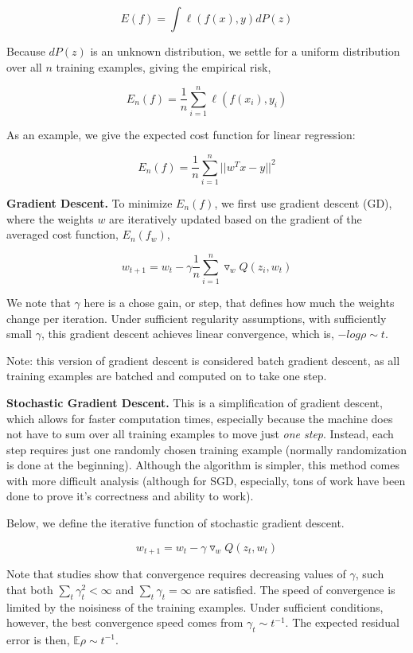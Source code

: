 \documentclass[twoside]{article}
\theoremstyle{definition}
\theoremstyle{definition}
\theoremstyle{remark}
\begin{document}
$$ E(f) = \int \ell(f(x), y) dP(z) $$

Because $dP(z)$ is an unknown distribution, we settle for a uniform distribution over all $n$ training examples, giving the empirical risk, 

$$ E_n (f) = \frac{1}{n} \sum_{i=1}^{n} \ell(f(x_i), y_i) $$

As an example, we give the expected cost function for linear regression:

$$ E_n (f) = \frac{1}{n} \sum_{i=1}^{n} ||w^T x - y||^2 $$

\textbf{Gradient Descent.} To minimize $E_n (f)$, we first use gradient descent (GD), where the weights $w$ are iteratively updated based on the gradient of the averaged cost function, $E_n (f_w)$,

$$ w_{t+1} = w_t - \gamma  \frac{1}{n} \sum_{i=1}^{n} \triangledown_w Q(z_i, w_t) $$

We note that $\gamma$ here is a chose gain, or step, that defines how much the weights change per iteration. Under sufficient regularity assumptions, with sufficiently small $\gamma$, this gradient descent achieves linear convergence, which is, $- log \rho \sim t$. 

Note: this version of gradient descent is considered batch gradient descent, as all training examples are batched and computed on to take one step.

\textbf{Stochastic Gradient Descent.} This is a simplification of gradient descent, which allows for faster computation times, especially because the machine does not have to sum over all training examples to move just \emph{one step}. Instead, each step requires just one randomly chosen training example (normally randomization is done at the beginning). Although the algorithm is simpler, this method comes with more difficult analysis (although for SGD, especially, tons of work have been done to prove it's correctness and ability to work).

Below, we define the iterative function of stochastic gradient descent.

$$ w_{t+1} = w_t - \gamma \triangledown_w Q(z_t, w_t) $$

Note that studies show that convergence requires decreasing values of $\gamma$, such that both $\sum_t \gamma_t^2 < \infty$ and $\sum_t \gamma_t = \infty$ are satisfied. The speed of convergence is limited by the noisiness of the training examples. Under sufficient conditions, however, the best convergence speed comes from $\gamma_t \sim t^{-1}$. The expected residual error is then, $\mathbb{E} \rho \sim t^{-1}$.
\end{document}
